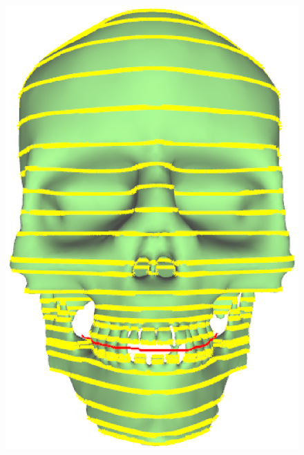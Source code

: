 \begin{figure} [htbp]
{\begin{minipage}[b]{0.28\textwidth}
      \includegraphics[scale=0.12]{figs/f6.skull-split.eps}%
    \end{minipage}}
\end{figure}

